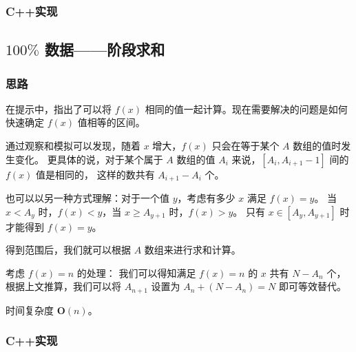 \subsubsection{C++实现}



\subsection{\texorpdfstring{$100\%$}{100\%} 数据——阶段求和}

\subsubsection{思路}

在提示中，指出了可以将 $f(x)$ 相同的值一起计算。现在需要解决的问题是如何快速确定 $f(x)$ 值相等的区间。

通过观察和模拟可以发现，随着 $x$ 增大，$f(x)$ 只会在等于某个 $A$ 数组的值时发生变化。
更具体的说，对于某个属于 $A$ 数组的值 $A_i$ 来说，$[A_i,A_{i+1}-1]$ 间的 $f(x)$ 值是相同的，
这样的数共有 $A_{i+1}-A_i$ 个。

也可以以另一种方式理解：对于一个值 $y$，考虑有多少 $x$ 满足 $f(x)=y$。
当 $x<A_y$ 时，$f(x)<y$，当 $x\ge A_{y+1}$ 时，$f(x)>y$。
只有 $x\in [A_y,A_{y+1}]$ 时才能得到 $f(x)=y$。

得到范围后，我们就可以根据 $A$ 数组来进行求和计算。

考虑 $f(x)=n$ 的处理：
我们可以得知满足 $f(x)=n$ 的 $x$ 共有 $N-A_n$ 个，
根据上文推算，我们可以将 $A_{n+1}$ 设置为 $A_n+(N-A_n)=N$ 即可等效替代。

时间复杂度 $\mathbf{O}(n)$。

\subsubsection{C++实现}

